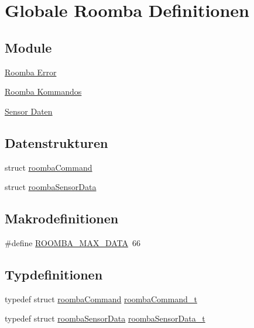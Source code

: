 \hypertarget{group__roomba__def}{\section{Globale Roomba Definitionen}
\label{group__roomba__def}
}
\subsection*{Module}
\begin{DoxyCompactItemize}
\item 
\hyperlink{group__roomba__error}{Roomba Error}
\item 
\hyperlink{group__roomba__commands}{Roomba Kommandos}
\item 
\hyperlink{group__roomba__sensor}{Sensor Daten}
\end{DoxyCompactItemize}
\subsection*{Datenstrukturen}
\begin{DoxyCompactItemize}
\item 
struct \hyperlink{structroombaCommand}{roomba\-Command}
\item 
struct \hyperlink{structroombaSensorData}{roomba\-Sensor\-Data}
\end{DoxyCompactItemize}
\subsection*{Makrodefinitionen}
\begin{DoxyCompactItemize}
\item 
\#define \hyperlink{group__roomba__def_ga53c32c129fde6d7594f43690d6d81d97}{R\-O\-O\-M\-B\-A\-\_\-\-M\-A\-X\-\_\-\-D\-A\-T\-A}~66
\end{DoxyCompactItemize}
\subsection*{Typdefinitionen}
\begin{DoxyCompactItemize}
\item 
typedef struct \hyperlink{structroombaCommand}{roomba\-Command} \hyperlink{group__roomba__def_gae2455d95f239542954d232e31bb04a0e}{roomba\-Command\-\_\-t}
\item 
typedef struct \hyperlink{structroombaSensorData}{roomba\-Sensor\-Data} \hyperlink{group__roomba__def_gab15b5566c76fa573575afaccd593e86a}{roomba\-Sensor\-Data\-\_\-t}
\end{DoxyCompactItemize}


